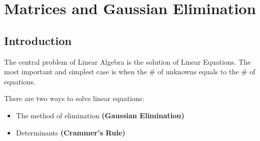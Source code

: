 \chapter{Matrices and Gaussian Elimination}
\section{Introduction}

The central problem of Linear Algebra is the solution of Linear Equations. The most important and simplest case is when the $\#$ of unknowns equals to the $\#$ of equations.

\begin{note}
There are two ways to solve linear equations:
\begin{itemize}
    \item The method of elimination \textbf{(Gaussian Elimination)}
    \item Determinants \textbf{(Crammer's Rule)}
\end{itemize}
\end{note}

